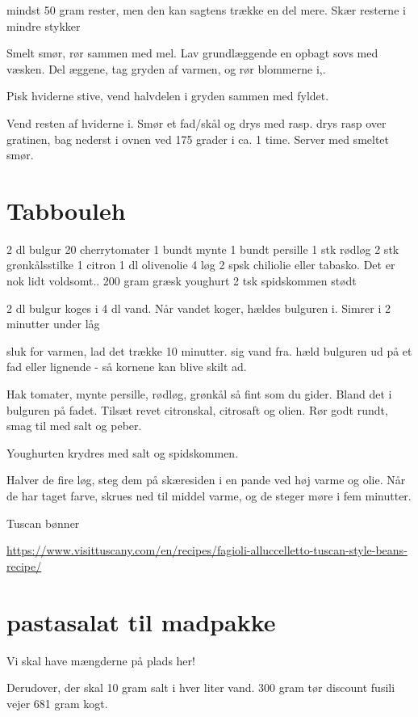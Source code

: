 \documentclass[
]{book}
\begin{document}
mindst 50 gram rester, men den kan sagtens trække en del mere.
Skær resterne i mindre stykker

Smelt smør, rør sammen med mel. Lav grundlæggende en opbagt
sovs med væsken.
Del æggene, tag gryden af varmen, og rør blommerne i,.

Pisk hviderne stive, vend halvdelen i gryden sammen med fyldet.

Vend resten af hviderne i. Smør et fad/skål
og drys med rasp. drys rasp over gratinen, bag nederst i ovnen
ved 175 grader i ca. 1 time. Server med smeltet smør.

\hypertarget{tabbouleh}{%
\section{Tabbouleh}\label{tabbouleh}}

2 dl bulgur
20 cherrytomater
1 bundt mynte
1 bundt persille
1 stk rødløg
2 stk grønkålsstilke
1 citron
1 dl olivenolie
4 løg
2 spsk chiliolie eller tabasko. Det er nok lidt voldsomt..
200 gram græsk youghurt
2 tsk spidskommen stødt

2 dl bulgur koges i 4 dl vand. Når vandet koger, hældes bulguren i. Simrer i 2 minutter under låg

sluk for varmen, lad det trække 10 minutter. sig vand fra.
hæld bulguren ud på et fad eller lignende - så kornene kan blive skilt ad.

Hak tomater, mynte persille, rødløg, grønkål så fint som du gider. Bland det i bulguren på fadet.
Tilsæt revet citronskal, citrosaft og olien. Rør godt rundt, smag til med salt og peber.

Youghurten krydres med salt og spidskommen.

Halver de fire løg, steg dem på skæresiden i en pande ved høj varme og olie. Når de har taget farve, skrues ned til middel varme, og
de steger møre i fem minutter.

Tuscan bønner

\url{https://www.visittuscany.com/en/recipes/fagioli-alluccelletto-tuscan-style-beans-recipe/}

\hypertarget{pastasalat-til-madpakke}{%
\section{pastasalat til madpakke}\label{pastasalat-til-madpakke}}

Vi skal have mængderne på plads her!

Derudover, der skal 10 gram salt i hver liter vand.
300 gram tør discount fusili vejer
681 gram kogt.
\end{document}
